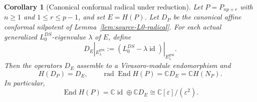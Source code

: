 \documentclass[12pt,leqno]{amsart}
\numberwithin{equation}{section}
\newtheorem{cor}[thm]{Corollary}
\newcommand{\End}{\operatorname{End}}
\newcommand{\rad}{\operatorname{rad}}
\newcommand{\id}{\operatorname{id}}
\def\C{\mathbb{C}}
\begin{document}
\begin{cor}[Canonical conformal radical under reduction]
\label{cor:H-projective-radical}
Let $P=P_{np+r}$ with $n\ge1$ and $1\le r\le p-1$, and set $E=H(P)$.
Let $D_P$ be the canonical affine conformal nilpotent of
Lemma~\ref{lem:source-L0-radical}.  For each actual generalized
$L^{DS}_0$-eigenvalue $\lambda$ of $E$, define
\[
 D_E|_{E^{\mathrm{gen}}_\lambda}
 :=(L^{DS}_0-\lambda\id)|_{E^{\mathrm{gen}}_\lambda}.
\]
Then the operators $D_E$ assemble to a Virasoro-module endomorphism and
\begin{equation}\label{eq:H-canonical-radical}
 H(D_P)=D_E,
 \qquad
 \rad\End H(P)=\C D_E=\C H(N_P).
\end{equation}
In particular,
\[
 \End H(P)=\C\id\oplus\C D_E
 \cong\C[\varepsilon]/(\varepsilon^2).
\]
\end{cor}
\end{document}

